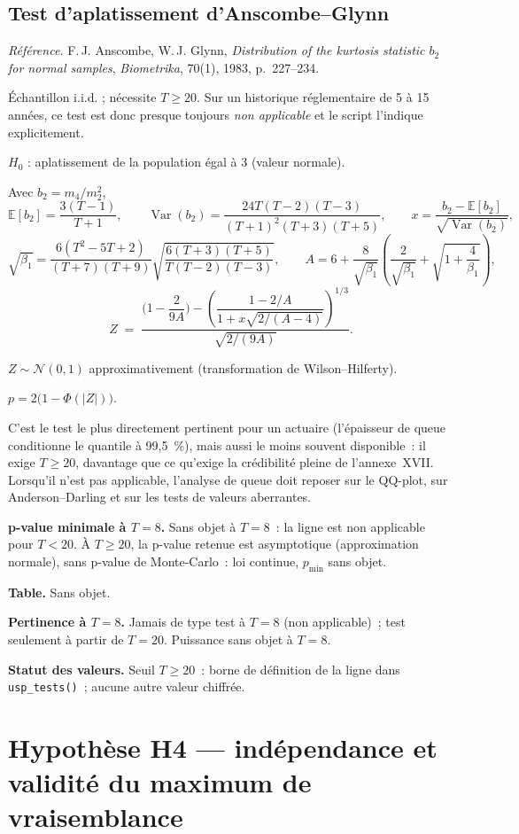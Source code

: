 \documentclass[a4paper,11pt]{article}
\newcommand{\code}[1]{\texttt{\small #1}}
\newcommand{\refl}[1]{{\small\textcolor{maincolor!70!black}{\textit{Référence.} #1}}\par\smallskip}
\newcounter{ficheid}
\newenvironment{fiche}[1]{%
  \stepcounter{ficheid}%
  \phantomsection
  \subsection{#1}%
  \label{fiche:\theficheid}%
}{%
  \end{description}\vspace{0.5em}%
}
\newcommand{\Cadre}{%
  \begin{description}[leftmargin=0pt, style=unboxed, itemsep=3pt, topsep=3pt, parsep=2pt]%
  \item[\textcolor{financeblue}{\textbf{1. Cadre, notations et hypothèses de validité (non testées).}}]}
\newcommand{\Hzero}{\item[\textcolor{financeblue}{\textbf{2. Hypothèse nulle.}}]}
\newcommand{\Stat}{\item[\textcolor{financeblue}{\textbf{3. Statistique de test.}}]}
\newcommand{\Loi}{\item[\textcolor{financeblue}{\textbf{4. Loi sous $H_0$.}}]}
\newcommand{\Pval}{\item[\textcolor{financeblue}{\textbf{5. p-value.}}]}
\newcommand{\Usage}{\item[\textcolor{financeblue}{\textbf{6. Usage et limites.}}]}
\newcommand{\Pertinence}{\item[\textcolor{financeblue}{\textbf{7. Pertinence et puissance à faible $T$.}}]}
\begin{document}
\begin{fiche}{Test d'aplatissement d'Anscombe--Glynn}
\label{fiche:anscombe-glynn-aplatissement}%
\refl{F.\,J. Anscombe, W.\,J. Glynn, \emph{Distribution of the kurtosis statistic $b_2$ for
normal samples}, \emph{Biometrika}, 70(1), 1983, p.~227--234.}
\Cadre
Échantillon i.i.d. ; nécessite $T \ge 20$. Sur un historique réglementaire de 5 à 15 années, ce
test est donc presque toujours \emph{non applicable} et le script l'indique explicitement.
\Hzero
$H_0$ : aplatissement de la population égal à 3 (valeur normale).
\Stat
Avec $b_2 = m_4/m_2^2$,
\[
  \mathbb{E}[b_2] = \frac{3(T-1)}{T+1},
  \qquad
  \operatorname{Var}(b_2) = \frac{24T(T-2)(T-3)}{(T+1)^2(T+3)(T+5)},
  \qquad
  x = \frac{b_2 - \mathbb{E}[b_2]}{\sqrt{\operatorname{Var}(b_2)}},
\]
\[
  \sqrt{\beta_1} = \frac{6(T^2-5T+2)}{(T+7)(T+9)}\sqrt{\frac{6(T+3)(T+5)}{T(T-2)(T-3)}},
  \qquad
  A = 6 + \frac{8}{\sqrt{\beta_1}}\left(\frac{2}{\sqrt{\beta_1}} + \sqrt{1 + \frac{4}{\beta_1}}\right),
\]
\[
  Z \;=\; \frac{\Big(1 - \dfrac{2}{9A}\Big) - \left(\dfrac{1 - 2/A}{1 + x\sqrt{2/(A-4)}}\right)^{1/3}}
                {\sqrt{2/(9A)}} .
\]
\Loi
$Z \sim \mathcal{N}(0,1)$ approximativement (transformation de Wilson--Hilferty).
\Pval
$p = 2\big(1 - \Phi(|Z|)\big)$.
\Usage
C'est le test le plus directement pertinent pour un actuaire (l'épaisseur de queue conditionne le
quantile à 99,5~\%), mais aussi le moins souvent disponible~: il exige $T \ge 20$, davantage que
ce qu'exige la crédibilité pleine de l'annexe~XVII. Lorsqu'il n'est pas applicable, l'analyse de
queue doit reposer sur le QQ-plot, sur Anderson--Darling et sur les tests de valeurs aberrantes.
\Pertinence
\textbf{p-value minimale à $T = 8$.} Sans objet à $T = 8$~: la ligne est non applicable pour $T < 20$. À $T \ge 20$, la p-value retenue est asymptotique (approximation normale), sans p-value de Monte-Carlo~: loi continue, $p_{\min}$ sans objet.

\textbf{Table.} Sans objet.

\textbf{Pertinence à $T = 8$.} Jamais de type test à $T = 8$ (non applicable)~; test seulement à partir de $T = 20$. Puissance sans objet à $T = 8$.

\textbf{Statut des valeurs.} Seuil $T \ge 20$~: borne de définition de la ligne dans \code{usp\_tests()}~; aucune autre valeur chiffrée.
\end{fiche}

\newpage
\clearpage
\section{Hypothèse H4 --- indépendance et validité du maximum de vraisemblance}
\label{sec:h4}
\end{document}
